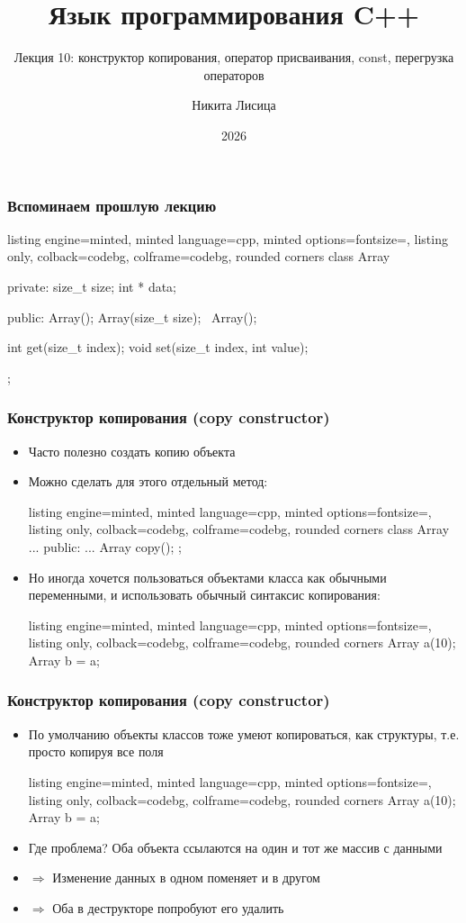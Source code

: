 \documentclass[10pt]{beamer}
\title{Язык программирования C++}
\subtitle{Лекция 10: конструктор копирования, оператор присваивания, const, перегрузка операторов}
\date{2026}
\author{Никита Лисица}
\begin{document}
\frame{\titlepage}

\begin{frame}[fragile]
\frametitle{Вспоминаем прошлую лекцию}
\begin{tcblisting}{listing engine=minted, minted language=cpp, minted options={fontsize=\scriptsize}, listing only, colback=codebg, colframe=codebg, rounded corners}
class Array {
private:
  size_t size;
  int * data;

public:
  Array();
  Array(size_t size);
  ~Array();

  int get(size_t index);
  void set(size_t index, int value);
};
\end{tcblisting}
\end{frame}

\begin{frame}[fragile]
\frametitle{Конструктор копирования (copy constructor)}
\begin{itemize}
\item Часто полезно создать копию объекта
\pause
\item Можно сделать для этого отдельный метод:
\begin{tcblisting}{listing engine=minted, minted language=cpp, minted options={fontsize=\scriptsize}, listing only, colback=codebg, colframe=codebg, rounded corners}
class Array {
  ...
public:
  ...
  Array copy();
};
\end{tcblisting}
\pause
\item Но иногда хочется пользоваться объектами класса как обычными переменными, и использовать обычный синтаксис копирования:
\begin{tcblisting}{listing engine=minted, minted language=cpp, minted options={fontsize=\scriptsize}, listing only, colback=codebg, colframe=codebg, rounded corners}
Array a(10);
Array b = a;
\end{tcblisting}
\end{itemize}
\end{frame}

\begin{frame}[fragile]
\frametitle{Конструктор копирования (copy constructor)}
\begin{itemize}
\item По умолчанию объекты классов тоже умеют копироваться, как структуры, т.е. просто копируя все поля
\pause
\begin{tcblisting}{listing engine=minted, minted language=cpp, minted options={fontsize=\scriptsize}, listing only, colback=codebg, colframe=codebg, rounded corners}
Array a(10);
Array b = a;
\end{tcblisting}
\item Где проблема? \pause Оба объекта ссылаются на один и тот же массив с данными
\pause
\item \(\Longrightarrow\) Изменение данных в одном поменяет и в другом
\pause
\item \(\Longrightarrow\) Оба в деструкторе попробуют его удалить
\end{itemize}
\end{frame}
\end{document}
